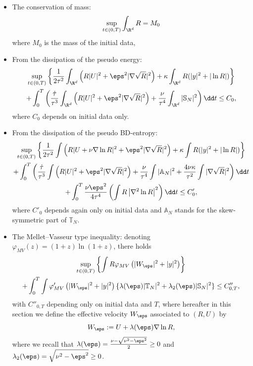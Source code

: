 \begin{itemize}
\item[$\bullet$] The conservation of mass:
\begin{equation}\label{eq_mass}
\sup_{t \in (0,T)} \int_{\R^d} R = M_0
\end{equation}
where $M_0$ is the mass of the initial data,
\item[$\bullet$] From the dissipation of the pseudo energy:
\begin{multline}\label{eq_dissipation_eps<nu}
\sup_{t \in (0,T)} \left\{ \dfrac{1}{2\tau^2} \int_{\R^d} \left(R|U|^2 + \eps^2|\nabla \sqrt R|^2 \right) + \kappa \int_{\R^d} R (|y|^2 + |\ln R|) \right\} \\
+ \int_0^T \left(\dfrac{\dot{\tau}}{\tau^3} \int_{\R^d} \left(R |U|^2 + \eps^2|\nabla \sqrt R|^2 \right) + \dfrac{\nu}{\tau^4}
\int_{\R^d} |\mathbb S_{N}|^2 \right) \dd t
\le C_0,
\end{multline}
where $C_0$ depends on initial data only.
\item[$\bullet$] From the dissipation of the pseudo BD-entropy:
\begin{multline}\label{eq_BD_eps<nu}
\sup_{t \in (0,T)} \left\{\dfrac{1}{2\tau^2} \int \left(R |U + \nu \nabla \ln R|^2 + \eps^2 |\nabla \sqrt R|^2 \right) + \kappa\int R (|y|^2 + |\ln R|) \right\} \\
+ \int_{0}^T \left(\dfrac{\dot{\tau}}{\tau^3} \int\left(R |U|^2 +
\eps^2|\nabla \sqrt R|^2 \right) + \dfrac{\nu}{\tau^4} \int |\mathbb A_N|^2 + \dfrac{4\nu \kappa }{\tau^2} \int |\nabla \sqrt{R}|^2
\right) \dd t \\
+ \int_{0}^T \dfrac{\nu \eps^2 }{4\tau^4}
\left(\int R\left|\nabla^2\ln R\right|^2\right) \dd t
\le C'_0,
\end{multline}
where $C'_0$ depends again only on initial data and $\mathbb A_N$ stands for the skew-symmetric part of $\mathbb T_N$.
\item[$\bullet$] The Mellet--Vasseur type inequality: denoting $\varphi_{MV}(z) = (1+z) \ln(1+z)$, there holds
\begin{multline}\label{eq_MV_eps<nu}
\sup_{t \in (0,T)} \left\{ \int R \varphi_{MV}\left(|W_\eps|^2 + |y|^2 \right) \right\} \\
+ \int_{0}^T \int \varphi'_{MV}\left(|W_\eps|^2+ |y|^2\right) \{ \lambda(\eps)|\mathbb T_N|^2 + \lambda_2(\eps)|\mathbb S_N|^2 \}
\le C''_{0,T},
\end{multline}
with $C''_{0,T}$ depending only on initial data and $T$, where hereafter in this section we define the effective velocity $W_\eps$ associated to $(R,U)$ by
\begin{equation*}
W_\eps := U + \lambda(\eps) \nabla \ln R,
\end{equation*}
where we recall that $\lambda(\eps) = \frac{\nu - \sqrt{\nu^2 - \eps^2}}{2} \ge 0$ and $\lambda_2(\eps) = \sqrt{\nu^2 - \eps^2} \ge 0$.
\end{itemize}

